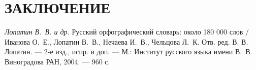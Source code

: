 \section*{ЗАКЛЮЧЕНИЕ}

\newpage

\renewcommand{\refname}{СПИСОК ИСПОЛЬЗОВАННЫХ ИСТОЧНИКОВ}

\begin{thebibliography}{99}
    \textit{Лопатин В.~В. и др.}  Русский орфографический словарь: 
    около 180 000 слов / Иванова О.~Е., Лопатин В.~В., Нечаева И.~В., 
    Чельцова Л.~К. Отв. ред. В. В. Лопатин. --- 2-е изд., испр. и доп. --- 
    М.: Институт русского языка имени В.~В. Виноградова РАН, 
    2004. --- 960 с.
     
\end{thebibliography}

